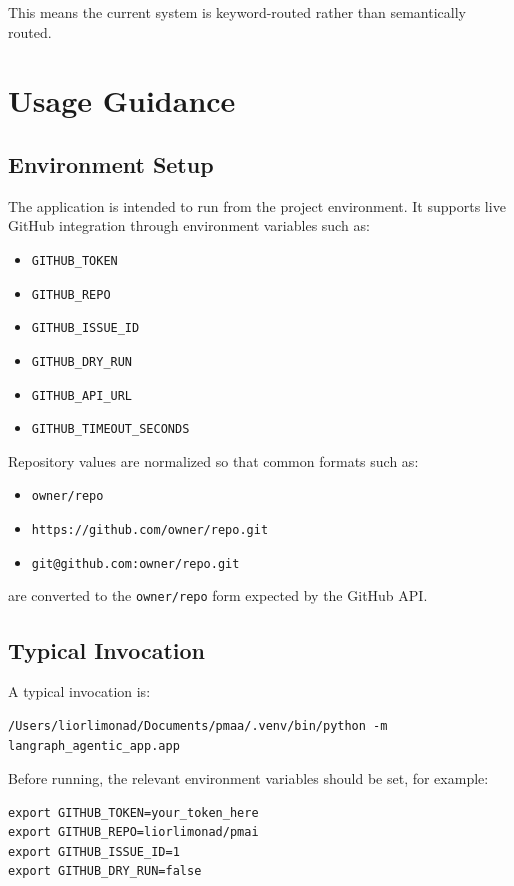 \documentclass[11pt,a4paper]{article}
\begin{document}
This means the current system is keyword-routed rather than semantically routed.

\section{Usage Guidance}

\subsection{Environment Setup}

The application is intended to run from the project environment. It supports live GitHub integration through environment variables such as:
\begin{itemize}
    \item \texttt{GITHUB\_TOKEN}
    \item \texttt{GITHUB\_REPO}
    \item \texttt{GITHUB\_ISSUE\_ID}
    \item \texttt{GITHUB\_DRY\_RUN}
    \item \texttt{GITHUB\_API\_URL}
    \item \texttt{GITHUB\_TIMEOUT\_SECONDS}
\end{itemize}

Repository values are normalized so that common formats such as:
\begin{itemize}
    \item \texttt{owner/repo}
    \item \texttt{https://github.com/owner/repo.git}
    \item \texttt{git@github.com:owner/repo.git}
\end{itemize}
are converted to the \texttt{owner/repo} form expected by the GitHub API.

\subsection{Typical Invocation}

A typical invocation is:

\begin{lstlisting}[style=bashstyle]
/Users/liorlimonad/Documents/pmaa/.venv/bin/python -m langraph_agentic_app.app
\end{lstlisting}

Before running, the relevant environment variables should be set, for example:

\begin{lstlisting}[style=bashstyle]
export GITHUB_TOKEN=your_token_here
export GITHUB_REPO=liorlimonad/pmai
export GITHUB_ISSUE_ID=1
export GITHUB_DRY_RUN=false
\end{lstlisting}
\end{document}
